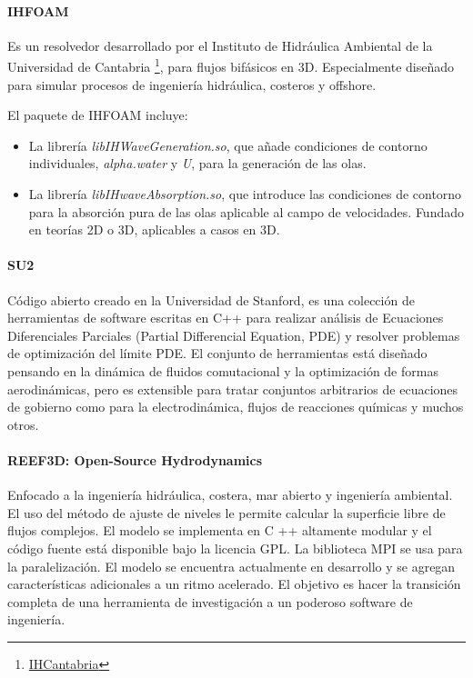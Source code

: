 \paragraph{IHFOAM\cite{IHFOAM}}\label{header-n274}

Es un resolvedor desarrollado por el Instituto de Hidráulica Ambiental
de la Universidad de Cantabria
\footnote{\href{http://www.ihcantabria.com/es/}{IHCantabria}}, para flujos
bifásicos en 3D. Especialmente diseñado para simular procesos de
ingeniería hidráulica, costeros y offshore.

El paquete de IHFOAM incluye:

\begin{itemize}
\item
  La librería \emph{libIHWaveGeneration.so}, que añade condiciones de
  contorno individuales, \emph{alpha.water} y \emph{U}, para la
  generación de las olas.
\item
  La librería \emph{libIHwaveAbsorption.so}, que introduce las
  condiciones de contorno para la absorción pura de las olas aplicable
  al campo de velocidades. Fundado en teorías 2D o 3D, aplicables a
  casos en 3D.
\end{itemize}

\paragraph{SU2\cite{cfd-online_6}}\label{header-n286}

Código abierto creado en la Universidad de Stanford, es una colección de
herramientas de software escritas en C++ para realizar análisis de
Ecuaciones Diferenciales Parciales (Partial Differencial Equation, PDE)
y resolver problemas de optimización del límite PDE. El conjunto de
herramientas está diseñado pensando en la dinámica de fluidos
comutacional y la optimización de formas aerodinámicas, pero es
extensible para tratar conjuntos arbitrarios de ecuaciones de gobierno
como para la electrodinámica, flujos de reacciones químicas y muchos
otros.

\paragraph{REEF3D: Open-Source Hydrodynamics\cite{REEF3D}}\label{header-n289}

Enfocado a la ingeniería hidráulica, costera, mar abierto y ingeniería
ambiental. El uso del método de ajuste de niveles le permite calcular la
superficie libre de flujos complejos. El modelo se implementa en C ++
altamente modular y el código fuente está disponible bajo la licencia
GPL. La biblioteca MPI se usa para la paralelización. El modelo se
encuentra actualmente en desarrollo y se agregan características
adicionales a un ritmo acelerado. El objetivo es hacer la transición
completa de una herramienta de investigación a un poderoso software de
ingeniería.

